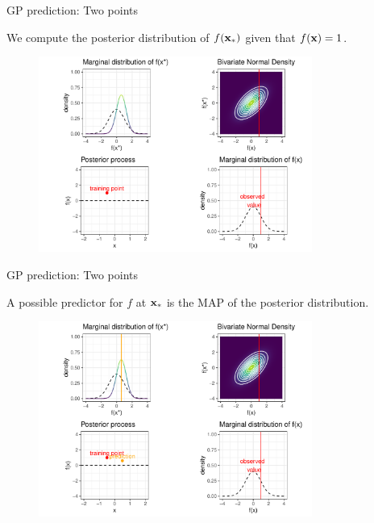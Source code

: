 \begin{frame}{GP prediction: Two points}

\begin{footnotesize}
  We compute the posterior distribution of $f(\mathbf{x}_*)$ given that $f(\mathbf{x}) = 1$. 
\end{footnotesize}\vspace*{0.2cm}


\begin{figure}
  \includegraphics[width=0.8\textwidth]{figure/gp_pred/4.pdf}
\end{figure}


\end{frame}
\begin{frame}{GP prediction: Two points}

\begin{footnotesize}
  A possible predictor for $f$ at $\mathbf{x}_*$ is the MAP of the posterior distribution.
\end{footnotesize}\vspace*{0.2cm}

\begin{figure}
  \includegraphics[width=0.8\textwidth]{figure/gp_pred/5.pdf}
\end{figure}


\end{frame} 

